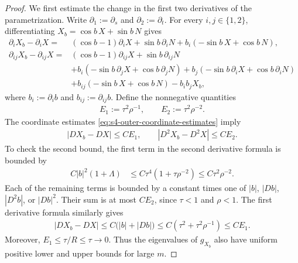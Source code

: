 \documentclass[a4paper,11pt,oneside,reqno]{amsart}
\numberwithin{equation}{section}
\theoremstyle{definition}
\begin{document}
\begin{proof}
    We first estimate the change in the first two
    derivatives of the parametrization. Write
    $\partial_1:=\partial_s$ and $\partial_2:=\partial_t$.
    For every $i,j\in\{1,2\}$, differentiating
    $X_b=\cos b\,X+\sin b\,N$ gives
    \begin{align*}
        \partial_iX_b-\partial_iX
        ={}&(\cos b-1)\partial_iX+\sin b\,\partial_iN
             +b_i(-\sin b\,X+\cos b\,N),\\
        \partial_{ij}X_b-\partial_{ij}X
        ={}&(\cos b-1)\partial_{ij}X
             +\sin b\,\partial_{ij}N\\
        &+b_i(-\sin b\,\partial_jX+\cos b\,\partial_jN)
         +b_j(-\sin b\,\partial_iX+\cos b\,\partial_iN)\\
        &+b_{ij}(-\sin b\,X+\cos b\,N)
         -b_ib_jX_b,
    \end{align*}
    where $b_i:=\partial_i b$ and
    $b_{ij}:=\partial_{ij}b$. Define the nonnegative
    quantities
    \begin{align*}
        E_1:=\tau^2\rho^{-1},\qquad
        E_2:=\tau^2\rho^{-2}.
    \end{align*}
    The coordinate estimates
    \eqref{eq:s4-outer-coordinate-estimates} imply
    \begin{align}
        \label{eq:s4-transverse-E12}
        |DX_b-DX|\leq CE_1,\qquad
        |D^2X_b-D^2X|\leq CE_2.
    \end{align}
    To check the second bound, the first term in the
    second derivative formula is bounded by
    \begin{align*}
        C|b|^2(1+\Lambda)
        &\leq C\tau^4(1+\tau\rho^{-2})
        \leq C\tau^2\rho^{-2}.
    \end{align*}
    Each of the remaining terms is bounded by a constant
    times one of $|b|$, $|Db|$, $|D^2b|$, or $|Db|^2$.
    Their sum is at most $CE_2$, since $\tau<1$ and
    $\rho<1$. The first derivative formula similarly gives
    \begin{align*}
        |DX_b-DX|
        \leq C\bigl(|b|+|Db|\bigr)
        \leq C(\tau^2+\tau^2\rho^{-1})
        \leq CE_1.
    \end{align*}
    Moreover, $E_1\leq\tau/R\leq\tau\to0$.
    Thus the eigenvalues of $g_{X_b}$ also have uniform
    positive lower and upper bounds for large $m$.


\end{proof}
\end{document}
